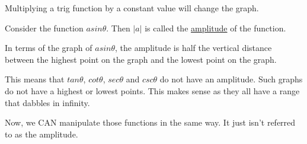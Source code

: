 \documentclass[10pt,letterpaper]{amspset}
\begin{document}
Multiplying a trig function by a constant value will change the graph.

Consider the function $a sin \theta$. Then $|a|$ is called the \underline{amplitude} of the function. \medskip

In terms of the graph of $a sin \theta$, the amplitude is half the vertical distance between the highest point on the graph and the lowest point on the graph. \medskip

This means that $tan \theta$, $cot \theta$, $sec \theta$ and $csc \theta$ do not have an amplitude. Such graphs do not have a highest or lowest points. This makes sense as they all have a range that dabbles in infinity. \medskip

Now, we CAN manipulate those functions in the same way. It just isn't referred to as the amplitude. \medskip





\end{document}
